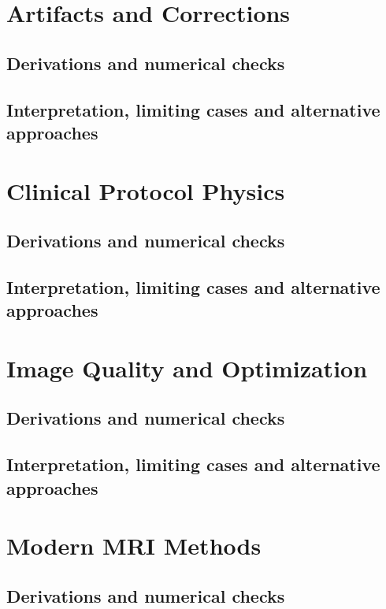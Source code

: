 \section{Artifacts and Corrections}
\label{sec:e:artifacts-and-corrections}
\subsection{Derivations and numerical checks}
\subsection{Interpretation, limiting cases and alternative approaches}
\par\pagebreak[1]

\section{Clinical Protocol Physics}
\label{sec:e:clinical-protocol-physics}
\subsection{Derivations and numerical checks}
\subsection{Interpretation, limiting cases and alternative approaches}
\par\pagebreak[1]

\section{Image Quality and Optimization}
\label{sec:e:image-quality-and-optimization}
\subsection{Derivations and numerical checks}
\subsection{Interpretation, limiting cases and alternative approaches}
\par\pagebreak[1]

\section{Modern MRI Methods}
\label{sec:e:modern-mri-methods}
\subsection{Derivations and numerical checks}

